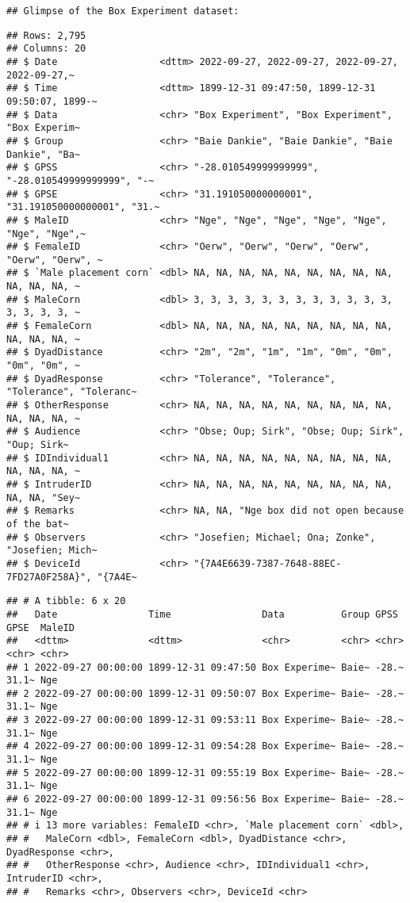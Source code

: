 \documentclass[
]{article}
\begin{document}
\begin{verbatim}
## Glimpse of the Box Experiment dataset:
\end{verbatim}

\begin{verbatim}
## Rows: 2,795
## Columns: 20
## $ Date                  <dttm> 2022-09-27, 2022-09-27, 2022-09-27, 2022-09-27,~
## $ Time                  <dttm> 1899-12-31 09:47:50, 1899-12-31 09:50:07, 1899-~
## $ Data                  <chr> "Box Experiment", "Box Experiment", "Box Experim~
## $ Group                 <chr> "Baie Dankie", "Baie Dankie", "Baie Dankie", "Ba~
## $ GPSS                  <chr> "-28.010549999999999", "-28.010549999999999", "-~
## $ GPSE                  <chr> "31.191050000000001", "31.191050000000001", "31.~
## $ MaleID                <chr> "Nge", "Nge", "Nge", "Nge", "Nge", "Nge", "Nge",~
## $ FemaleID              <chr> "Oerw", "Oerw", "Oerw", "Oerw", "Oerw", "Oerw", ~
## $ `Male placement corn` <dbl> NA, NA, NA, NA, NA, NA, NA, NA, NA, NA, NA, NA, ~
## $ MaleCorn              <dbl> 3, 3, 3, 3, 3, 3, 3, 3, 3, 3, 3, 3, 3, 3, 3, 3, ~
## $ FemaleCorn            <dbl> NA, NA, NA, NA, NA, NA, NA, NA, NA, NA, NA, NA, ~
## $ DyadDistance          <chr> "2m", "2m", "1m", "1m", "0m", "0m", "0m", "0m", ~
## $ DyadResponse          <chr> "Tolerance", "Tolerance", "Tolerance", "Toleranc~
## $ OtherResponse         <chr> NA, NA, NA, NA, NA, NA, NA, NA, NA, NA, NA, NA, ~
## $ Audience              <chr> "Obse; Oup; Sirk", "Obse; Oup; Sirk", "Oup; Sirk~
## $ IDIndividual1         <chr> NA, NA, NA, NA, NA, NA, NA, NA, NA, NA, NA, NA, ~
## $ IntruderID            <chr> NA, NA, NA, NA, NA, NA, NA, NA, NA, NA, NA, "Sey~
## $ Remarks               <chr> NA, NA, "Nge box did not open because of the bat~
## $ Observers             <chr> "Josefien; Michael; Ona; Zonke", "Josefien; Mich~
## $ DeviceId              <chr> "{7A4E6639-7387-7648-88EC-7FD27A0F258A}", "{7A4E~
\end{verbatim}

\begin{verbatim}
## # A tibble: 6 x 20
##   Date                Time                Data          Group GPSS  GPSE  MaleID
##   <dttm>              <dttm>              <chr>         <chr> <chr> <chr> <chr> 
## 1 2022-09-27 00:00:00 1899-12-31 09:47:50 Box Experime~ Baie~ -28.~ 31.1~ Nge   
## 2 2022-09-27 00:00:00 1899-12-31 09:50:07 Box Experime~ Baie~ -28.~ 31.1~ Nge   
## 3 2022-09-27 00:00:00 1899-12-31 09:53:11 Box Experime~ Baie~ -28.~ 31.1~ Nge   
## 4 2022-09-27 00:00:00 1899-12-31 09:54:28 Box Experime~ Baie~ -28.~ 31.1~ Nge   
## 5 2022-09-27 00:00:00 1899-12-31 09:55:19 Box Experime~ Baie~ -28.~ 31.1~ Nge   
## 6 2022-09-27 00:00:00 1899-12-31 09:56:56 Box Experime~ Baie~ -28.~ 31.1~ Nge   
## # i 13 more variables: FemaleID <chr>, `Male placement corn` <dbl>,
## #   MaleCorn <dbl>, FemaleCorn <dbl>, DyadDistance <chr>, DyadResponse <chr>,
## #   OtherResponse <chr>, Audience <chr>, IDIndividual1 <chr>, IntruderID <chr>,
## #   Remarks <chr>, Observers <chr>, DeviceId <chr>
\end{verbatim}
\end{document}
